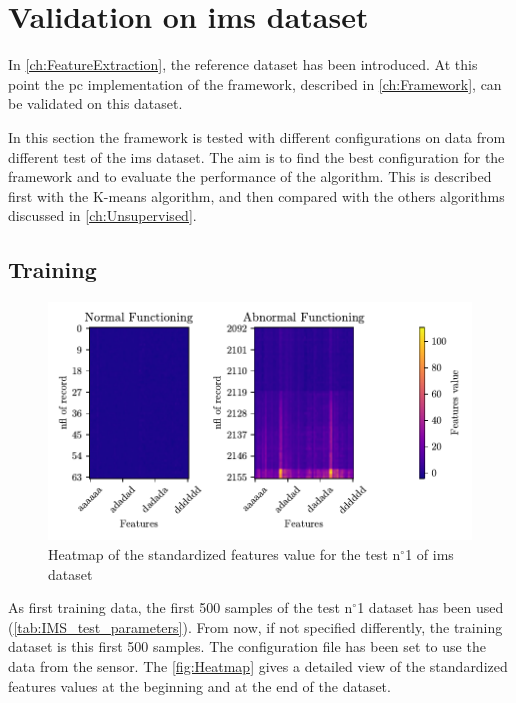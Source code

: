\section{Validation on \gls{ims} dataset}
\label{sec:ValidationOnRealWorldData}

In \autoref{ch:FeatureExtraction}, the reference dataset \cite{lee2007bearingdataset} has been introduced. At this point the \gls{pc} implementation of the framework, described in \autoref{ch:Framework}, can be validated on this dataset. 

In this section the framework is tested with different configurations on data from different test of the \gls{ims} dataset. The aim is to find the best configuration for the framework and to evaluate the performance of the algorithm. This is described first with the K-means algorithm, and then compared with the others algorithms discussed in \autoref{ch:Unsupervised}.

\subsection{Training}

\begin{figure}
    \centering
    \includegraphics{images/IMS/Heatmap.pdf}
    \caption{Heatmap of the standardized features value for the test $\text{n}^\circ$1 of \gls{ims} dataset}
    \label{fig:Heatmap}
\end{figure}

As first training data, the first 500 samples of the test $\text{n}^\circ$1 dataset has been used (\autoref{tab:IMS_test_parameters}). From now, if not specified differently, the training dataset is this first 500 samples. The configuration file has been set to use the data from the  sensor. The \autoref{fig:Heatmap} gives a detailed view  of the standardized features values at the beginning and at the end of the dataset.

